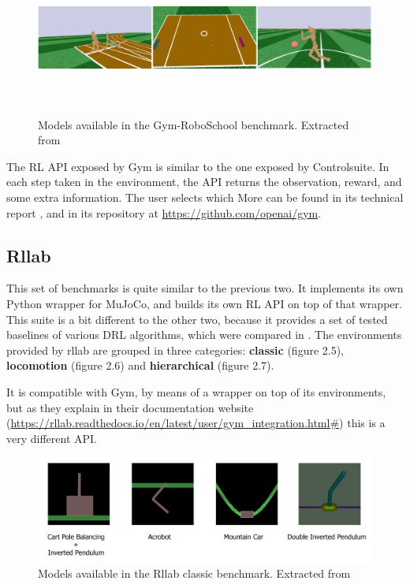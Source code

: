     \begin{figure}[!ht]
        \centering
        \includegraphics[width=6.0in,height=2.0in]{./chapters/imgs/img_openai_gym_roboschool_envs.png}
        \caption[Gym RoboSchool models]{Models available in the Gym-RoboSchool benchmark. Extracted from \citet{Gym}}
        \label{fig:gym-roboschool-envs}
    \end{figure}

    The RL API exposed by Gym is similar to the one exposed by Controlsuite. In each step taken in the environment, the API
    returns the observation, reward, and some extra information. The user selects which More can be found in its technical report \citep{Gym}, and
    in its repository at \url{https://github.com/openai/gym}.

    \subsection{Rllab}
    This set of benchmarks is quite similar to the previous two. It implements its own Python wrapper for MuJoCo, and 
    builds its own RL API on top of that wrapper. This suite is a bit different to the other two, because it provides
    a set of tested baselines of various DRL algorithms, which were compared in \cite{Rllab}. The environments provided 
    by rllab are grouped in three categories: \textbf{classic} (figure 2.5), \textbf{locomotion} (figure 2.6) and 
    \textbf{hierarchical} (figure 2.7).

    It is compatible with Gym, by means of a wrapper on top of its environments, but as they explain in their documentation
    website (\url{https://rllab.readthedocs.io/en/latest/user/gym_integration.html#}) this is a very different API.

    \begin{figure}[!ht]
        \centering
        \includegraphics[width=5.0in]{./chapters/imgs/img_rllab_envs_classic.png}
        \caption[rllab classic models]{Models available in the Rllab classic benchmark. Extracted from \citet{Rllab}}
        \label{fig:rllab-envs-classic}
    \end{figure}

